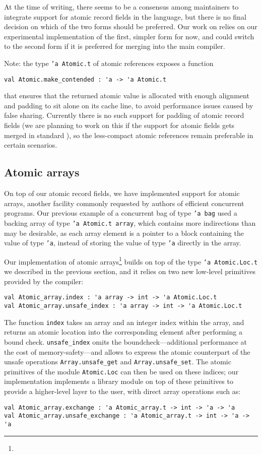 At the time of writing, there seems to be a consensus among \OCaml maintainers to integrate support for atomic record fields in the language, but there is no final decision on which of the two forms should be preferred.
Our work on \Zoo relies on our experimental implementation of the first, simpler form for now, and could switch to the second form if it is preferred for merging into the main compiler.

Note: the type \texttt{'a Atomic.t} of atomic references exposes a function
\begin{verbatim}
val Atomic.make_contended : 'a -> 'a Atomic.t
\end{verbatim}
that ensures that the returned atomic value is allocated with enough alignment and padding to sit alone on its cache line, to avoid performance issues caused by false sharing.
Currently there is no such support for padding of atomic record fields (we are planning to
work on this if the support for atomic fields gets merged in standard \OCaml), so the less-compact atomic references remain preferable in certain scenarios.

\subsection{Atomic arrays}

On top of our atomic record fields, we have implemented support for atomic arrays, another facility commonly requested by authors of efficient concurrent programs.
Our previous example of a concurrent bag of type \texttt{'a bag} used a backing array of type \texttt{'a Atomic.t array}, which contains more indirections than may be desirable, as each array element is a pointer to a block containing the value of type \texttt{'a}, instead of storing the value of type \texttt{'a} directly in the array.

Our implementation of atomic arrays\footnote{} builds on top of the type \texttt{'a Atomic.Loc.t} we described in the previous section, and it relies on two new low-level primitives provided by the compiler:

\begin{verbatim}
val Atomic_array.index : 'a array -> int -> 'a Atomic.Loc.t
val Atomic_array.unsafe_index : 'a array -> int -> 'a Atomic.Loc.t
\end{verbatim}

The function \texttt{index} takes an array and an integer index within the array, and returns an atomic location into the corresponding element after performing a bound check.
\texttt{unsafe_index} omits the boundcheck---additional performance at the cost of memory-safety---and allows to express the atomic counterpart of the unsafe operations \texttt{Array.unsafe_get} and \texttt{Array.unsafe_set}.
The atomic primitives of the module \texttt{Atomic.Loc} can then be used on these indices; our implementation implements a library module on top of these primitives to provide a higher-level layer to the user, with direct array operations such as:

\begin{verbatim}
val Atomic_array.exchange : 'a Atomic_array.t -> int -> 'a -> 'a
val Atomic_array.unsafe_exchange : 'a Atomic_array.t -> int -> 'a -> 'a
\end{verbatim}
